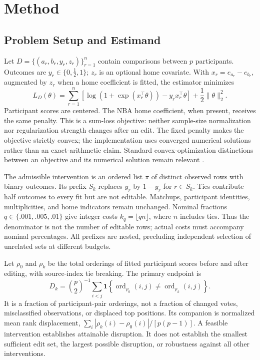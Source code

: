 \documentclass{article}
\begin{document}
\section{Method}
\subsection{Problem Setup and Estimand}
Let $D=\{(a_r,b_r,y_r,z_r)\}_{r=1}^n$ contain comparisons between $p$ participants. Outcomes are $y_r\in\{0,\tfrac12,1\}$; $z_r$ is an optional home covariate. With $x_r=e_{a_r}-e_{b_r}$, augmented by $z_r$ when a home coefficient is fitted, the estimator minimizes
\begin{equation}
 L_D(\theta)=\sum_{r=1}^{n}\left[\log(1+\exp(x_r^\top\theta))-y_rx_r^\top\theta\right]
       +\frac12\|\theta\|_2^2 .
 \label{eq:objective}
\end{equation}
Participant scores are centered. The NBA home coefficient, when present, receives the same penalty. This is a sum-loss objective: neither sample-size normalization nor regularization strength changes after an edit. The fixed penalty makes the objective strictly convex; the implementation uses converged numerical solutions rather than an exact-arithmetic claim. Standard convex-optimization distinctions between an objective and its numerical solution remain relevant \citep{Bubeck2015}.

The admissible intervention is an ordered list $\pi$ of distinct observed rows with binary outcomes. Its prefix $S_k$ replaces $y_r$ by $1-y_r$ for $r\in S_k$. Ties contribute half outcomes to every fit but are not editable. Matchups, participant identities, multiplicities, and home indicators remain unchanged. Nominal fractions $q\in\{.001,.005,.01\}$ give integer costs $k_q=\lfloor qn\rfloor$, where $n$ includes ties. Thus the denominator is not the number of editable rows; actual costs must accompany nominal percentages. All prefixes are nested, precluding independent selection of unrelated sets at different budgets.

Let $\rho_0$ and $\rho_k$ be the total orderings of fitted participant scores before and after editing, with source-index tie breaking. The primary endpoint is
\begin{equation}
 D_k=\binom{p}{2}^{-1}\sum_{i<j}
 \mathbf{1}\!\left\{\operatorname{ord}_{\rho_0}(i,j)\ne
                         \operatorname{ord}_{\rho_k}(i,j)\right\}.
 \label{eq:disruption}
\end{equation}
It is a fraction of participant-pair orderings, not a fraction of changed votes, misclassified observations, or displaced top positions. Its companion is normalized mean rank displacement, $\sum_i|\rho_k(i)-\rho_0(i)|/[p(p-1)]$. A feasible intervention establishes attainable disruption. It does not establish the smallest sufficient edit set, the largest possible disruption, or robustness against all other interventions.
\end{document}
